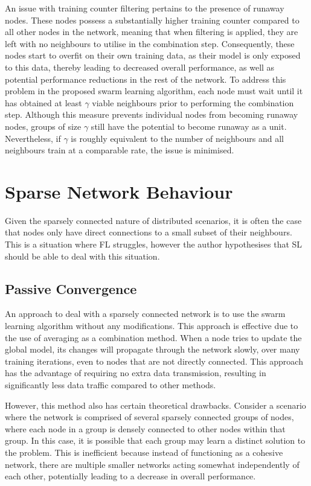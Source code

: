 An issue with training counter filtering pertains to the presence of runaway nodes. These nodes possess a substantially higher training counter compared to all other nodes in the network, meaning that when filtering is applied, they are left with no neighbours to utilise in the combination step. Consequently, these nodes start to overfit on their own training data, as their model is only exposed to this data, thereby leading to decreased overall performance, as well as potential performance reductions in the rest of the network. To address this problem in the proposed swarm learning algorithm, each node must wait until it has obtained at least $\gamma$ viable neighbours prior to performing the combination step. Although this measure prevents individual nodes from becoming runaway nodes, groups of size $\gamma$ still have the potential to become runaway as a unit. Nevertheless, if $\gamma$ is roughly equivalent to the number of neighbours and all neighbours train at a comparable rate, the issue is minimised.

\section{Sparse Network Behaviour}
Given the sparsely connected nature of distributed scenarios, it is often the case that nodes only have direct connections to a small subset of their neighbours. This is a situation where FL struggles, however the author hypothesises that SL should be able to deal with this situation.

\subsection{Passive Convergence}
An approach to deal with a sparsely connected network is to use the swarm learning algorithm without any modifications. This approach is effective due to the use of averaging as a combination method. When a node tries to update the global model, its changes will propagate through the network slowly, over many training iterations, even to nodes that are not directly connected. This approach has the advantage of requiring no extra data transmission, resulting in significantly less data traffic compared to other methods.

However, this method also has certain theoretical drawbacks. Consider a scenario where the network is comprised of several sparsely connected groups of nodes, where each node in a group is densely connected to other nodes within that group. In this case, it is possible that each group may learn a distinct solution to the problem. This is inefficient because instead of functioning as a cohesive network, there are multiple smaller networks acting somewhat independently of each other, potentially leading to a decrease in overall performance.


